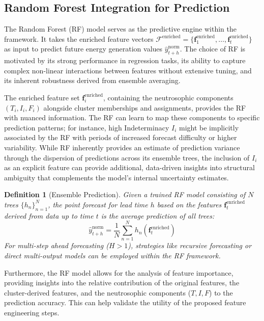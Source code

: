 \documentclass[review,3p,times]{elsarticle}
\newtheorem{definition}{Definition}[section]
\begin{document}
\subsection{Random Forest Integration for Prediction}
\label{sec:rf_integration}

The Random Forest (RF) model \cite{breiman2001random} serves as the predictive engine within the framework. It takes the enriched feature vectors $\mathcal{F}^{\text{enriched}} = \{\mathbf{f}_1^{\text{enriched}}, \dots, \mathbf{f}_t^{\text{enriched}}\}$ as input to predict future energy generation values $\hat{y}_{t+h}^{\text{norm}}$. The choice of RF is motivated by its strong performance in regression tasks, its ability to capture complex non-linear interactions between features without extensive tuning, and its inherent robustness derived from ensemble averaging.

The enriched feature set $\mathbf{f}_i^{\text{enriched}}$, containing the neutrosophic components $(T_i, I_i, F_i)$ alongside cluster memberships and assignments, provides the RF with nuanced information. The RF can learn to map these components to specific prediction patterns; for instance, high Indeterminacy $I_i$ might be implicitly associated by the RF with periods of increased forecast difficulty or higher variability. While RF inherently provides an estimate of prediction variance through the dispersion of predictions across its ensemble trees, the inclusion of $I_i$ as an explicit feature can provide additional, data-driven insights into structural ambiguity that complements the model's internal uncertainty estimates.

\begin{definition}[Ensemble Prediction]
Given a trained RF model consisting of $N$ trees $\{h_n\}_{n=1}^N$, the point forecast for lead time $h$ based on the features $\mathbf{f}_t^{\text{enriched}}$ derived from data up to time $t$ is the average prediction of all trees:
\begin{equation}
    \hat{y}_{t+h}^{\text{norm}} = \frac{1}{N} \sum_{n=1}^{N} h_n(\mathbf{f}_t^{\text{enriched}})
\end{equation}
For multi-step ahead forecasting ($H>1$), strategies like recursive forecasting or direct multi-output models can be employed within the RF framework.
\end{definition}

Furthermore, the RF model allows for the analysis of feature importance, providing insights into the relative contribution of the original features, the cluster-derived features, and the neutrosophic components ($T, I, F$) to the prediction accuracy. This can help validate the utility of the proposed feature engineering steps.
\end{document}
